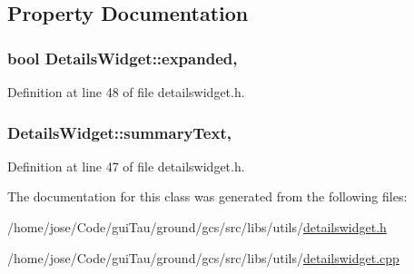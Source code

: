 \subsection{Property Documentation}
\hypertarget{class_utils_1_1_details_widget_ad8501e3bceffe4d07faa8436c9814325}{
\subsubsection[{expanded}]{\setlength{\rightskip}{0pt plus 5cm}bool Details\-Widget\-::expanded\hspace{0.3cm}{\ttfamily [read]}, {\ttfamily [write]}}}\label{class_utils_1_1_details_widget_ad8501e3bceffe4d07faa8436c9814325}


Definition at line 48 of file detailswidget.\-h.

\hypertarget{class_utils_1_1_details_widget_ae9dd376048ec5a0d2641e013d62e1f4a}{
\subsubsection[{summary\-Text}]{ Details\-Widget\-::summary\-Text\hspace{0.3cm}{\ttfamily [read]}, {\ttfamily [write]}}}\label{class_utils_1_1_details_widget_ae9dd376048ec5a0d2641e013d62e1f4a}


Definition at line 47 of file detailswidget.\-h.



The documentation for this class was generated from the following files\-:\begin{DoxyCompactItemize}
\item 
/home/jose/\-Code/gui\-Tau/ground/gcs/src/libs/utils/\hyperlink{detailswidget_8h}{detailswidget.\-h}\item 
/home/jose/\-Code/gui\-Tau/ground/gcs/src/libs/utils/\hyperlink{detailswidget_8cpp}{detailswidget.\-cpp}\end{DoxyCompactItemize}
